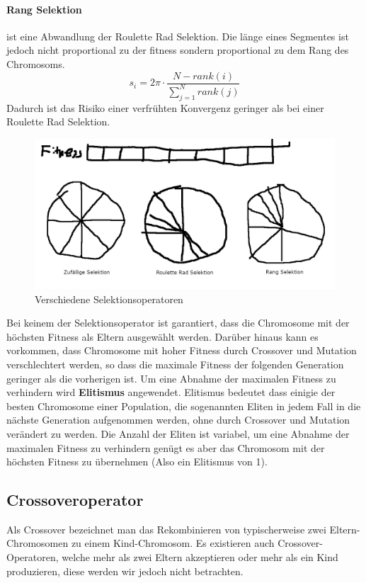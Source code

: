 \paragraph*{Rang Selektion} ist eine Abwandlung der Roulette Rad Selektion. Die länge eines Segmentes ist jedoch nicht proportional zu der fitness sondern proportional zu dem Rang des Chromosoms.
\begin{equation}
    s_i = 2 \pi \cdot \frac{N - rank(i)}{\sum_{j=1}^{N} rank(j)}
\end{equation}
Dadurch ist das Risiko einer verfrühten Konvergenz geringer als bei einer Roulette Rad Selektion.
\begin{figure}[h!]
    \includegraphics[scale=1.0]{images/Selection_Methods.png}
    \caption{Verschiedene Selektionsoperatoren}
    \label{fig:selection_operators}
\end{figure}

Bei keinem der Selektionsoperator ist garantiert, dass die Chromosome mit der höchsten Fitness als Eltern ausgewählt werden. Darüber hinaus kann es vorkommen, dass Chromosome mit hoher Fitness durch Crossover und Mutation verschlechtert werden, so dass die maximale Fitness der folgenden Generation geringer als die vorherigen ist. Um eine Abnahme der maximalen Fitness zu verhindern wird \textbf{Elitismus} angewendet. Elitismus bedeutet dass einigie der besten Chromosome einer Population, die sogenannten Eliten in jedem Fall in die nächste Generation aufgenommen werden, ohne durch Crossover und Mutation verändert zu werden. Die Anzahl der Eliten ist variabel, um eine Abnahme der maximalen Fitness zu verhindern genügt es aber das Chromosom mit der höchsten Fitness zu übernehmen (Also ein Elitismus von 1).

\subsection{Crossoveroperator}
Als Crossover bezeichnet man das Rekombinieren von typischerweise zwei Eltern-Chromosomen zu einem Kind-Chromosom. Es existieren auch Crossover-Operatoren, welche mehr als zwei Eltern akzeptieren oder mehr als ein Kind produzieren, diese werden wir jedoch nicht betrachten.

